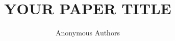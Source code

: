 \documentclass{article}
\title{YOUR PAPER TITLE}
\author{%
  Anonymous Authors
}
\begin{document}
\maketitle

\begin{abstract}

\end{abstract}







\clearpage



\appendix

\end{document}
